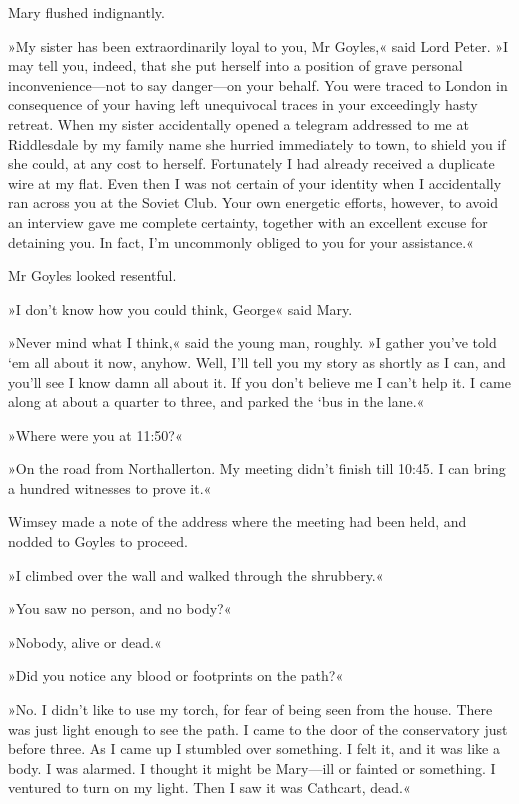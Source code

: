 Mary flushed indignantly.

»My sister has been extraordinarily loyal to you, Mr Goyles,« said Lord Peter. »I may tell you, indeed, that she put herself into a position of grave personal inconvenience—not to say danger—on your behalf. You were traced to London in consequence of your having left unequivocal traces in your exceedingly hasty retreat. When my sister accidentally opened a telegram addressed to me at Riddlesdale by my family name she hurried immediately to town, to shield you if she could, at any cost to herself. Fortunately I had already received a duplicate wire at my flat. Even then I was not certain of your identity when I accidentally ran across you at the Soviet Club. Your own energetic efforts, however, to avoid an interview gave me complete certainty, together with an excellent excuse for detaining you. In fact, I'm uncommonly obliged to you for your assistance.«

Mr Goyles looked resentful.

»I don't know how you could think, George\longdash« said Mary.

»Never mind what I think,« said the young man, roughly. »I gather you've told `em all about it now, anyhow. Well, I'll tell you my story as shortly as I can, and you'll see I know damn all about it. If you don't believe me I can't help it. I came along at about a quarter to three, and parked the `bus in the lane.«

»Where were you at 11:50?«

»On the road from Northallerton. My meeting didn't finish till 10:45. I can bring a hundred witnesses to prove it.«

Wimsey made a note of the address where the meeting had been held, and nodded to Goyles to proceed.

»I climbed over the wall and walked through the shrubbery.«

»You saw no person, and no body?«

»Nobody, alive or dead.«

»Did you notice any blood or footprints on the path?«

»No. I didn't like to use my torch, for fear of being seen from the house. There was just light enough to see the path. I came to the door of the conservatory just before three. As I came up I stumbled over something. I felt it, and it was like a body. I was alarmed. I thought it might be Mary—ill or fainted or something. I ventured to turn on my light. Then I saw it was Cathcart, dead.«

